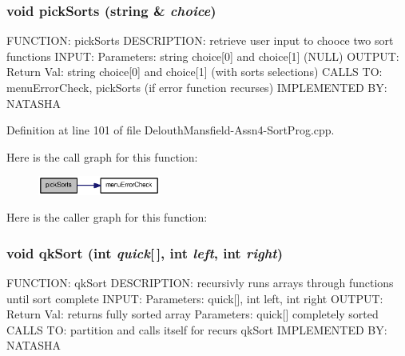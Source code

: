 \hypertarget{_delouth_mansfield-_assn4-_sort_prog_8cpp_a401a41ad70746c8dd39ecc19286b5e38}{
\subsubsection[{pickSorts}]{\setlength{\rightskip}{0pt plus 5cm}void pickSorts (string \& {\em choice})}}
\label{_delouth_mansfield-_assn4-_sort_prog_8cpp_a401a41ad70746c8dd39ecc19286b5e38}
FUNCTION: pickSorts DESCRIPTION: retrieve user input to chooce two sort functions INPUT: Parameters: string choice\mbox{[}0\mbox{]} and choice\mbox{[}1\mbox{]} (NULL) OUTPUT: Return Val: string choice\mbox{[}0\mbox{]} and choice\mbox{[}1\mbox{]} (with sorts selections) CALLS TO: menuErrorCheck, pickSorts (if error function recurses) IMPLEMENTED BY: NATASHA 

Definition at line 101 of file DelouthMansfield-\/Assn4-\/SortProg.cpp.



Here is the call graph for this function:\nopagebreak
\begin{figure}[H]
\begin{center}
\leavevmode
\includegraphics[width=114pt]{_delouth_mansfield-_assn4-_sort_prog_8cpp_a401a41ad70746c8dd39ecc19286b5e38_cgraph}
\end{center}
\end{figure}




Here is the caller graph for this function:

\hypertarget{_delouth_mansfield-_assn4-_sort_prog_8cpp_a4b4f1e40ba9dfe94bf95212975063b17}{
\subsubsection[{qkSort}]{\setlength{\rightskip}{0pt plus 5cm}void qkSort (int {\em quick}\mbox{[}$\,$\mbox{]}, \/  int {\em left}, \/  int {\em right})}}
\label{_delouth_mansfield-_assn4-_sort_prog_8cpp_a4b4f1e40ba9dfe94bf95212975063b17}
FUNCTION: qkSort DESCRIPTION: recursivly runs arrays through functions until sort complete INPUT: Parameters: quick\mbox{[}\mbox{]}, int left, int right OUTPUT: Return Val: returns fully sorted array Parameters: quick\mbox{[}\mbox{]} completely sorted CALLS TO: partition and calls itself for recurs qkSort IMPLEMENTED BY: NATASHA 

